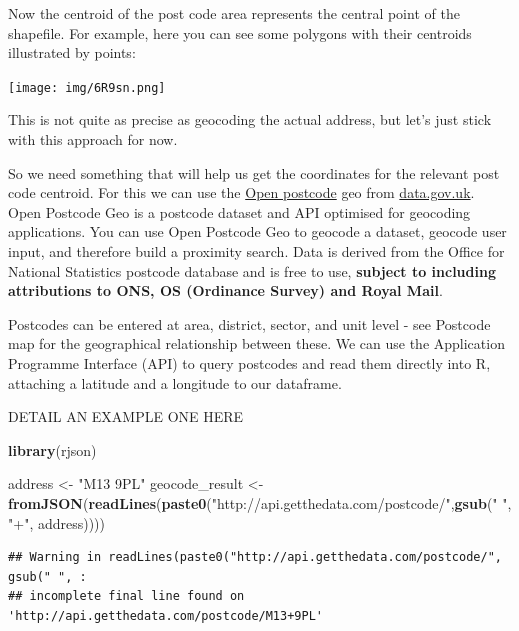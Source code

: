 \documentclass[]{book}
\newenvironment{Shaded}{\begin{snugshade}}{\end{snugshade}}
\newcommand{\KeywordTok}[1]{\textcolor[rgb]{0.13,0.29,0.53}{\textbf{#1}}}
\newcommand{\NormalTok}[1]{#1}
\newcommand{\OperatorTok}[1]{\textcolor[rgb]{0.81,0.36,0.00}{\textbf{#1}}}
\newcommand{\StringTok}[1]{\textcolor[rgb]{0.31,0.60,0.02}{#1}}
\begin{document}
Now the centroid of the post code area represents the central point of the shapefile. For example, here you can see some polygons with their centroids illustrated by points:

\texttt{[image: img/6R9sn.png]}

This is not quite as precise as geocoding the actual address, but let's just stick with this approach for now.

So we need something that will help us get the coordinates for the relevant post code centroid. For this we can use the \href{https://data.gov.uk/dataset/091feb1c-aea6-45c9-82bf-768a15c65307/open-postcode-geo}{Open postcode} geo from \url{data.gov.uk}. Open Postcode Geo is a postcode dataset and API optimised for geocoding applications. You can use Open Postcode Geo to geocode a dataset, geocode user input, and therefore build a proximity search. Data is derived from the Office for National Statistics postcode database and is free to use, \textbf{subject to including attributions to ONS, OS (Ordinance Survey) and Royal Mail}.

Postcodes can be entered at area, district, sector, and unit level - see Postcode map for the geographical relationship between these. We can use the Application Programme Interface (API) to query postcodes and read them directly into R, attaching a latitude and a longitude to our dataframe.

DETAIL AN EXAMPLE ONE HERE

\begin{Shaded}
\begin{Highlighting}[]
\KeywordTok{library}\NormalTok{(rjson)}

\NormalTok{address <-}\StringTok{ "M13 9PL"}
\NormalTok{geocode_result <-}\StringTok{ }\KeywordTok{fromJSON}\NormalTok{(}\KeywordTok{readLines}\NormalTok{(}\KeywordTok{paste0}\NormalTok{(}\StringTok{"http://api.getthedata.com/postcode/"}\NormalTok{,}\KeywordTok{gsub}\NormalTok{(}\StringTok{" "}\NormalTok{, }\StringTok{"+"}\NormalTok{, address))))}
\end{Highlighting}
\end{Shaded}

\begin{verbatim}
## Warning in readLines(paste0("http://api.getthedata.com/postcode/", gsub(" ", :
## incomplete final line found on 'http://api.getthedata.com/postcode/M13+9PL'
\end{verbatim}

\begin{Shaded}
\end{Shaded}
\end{document}
